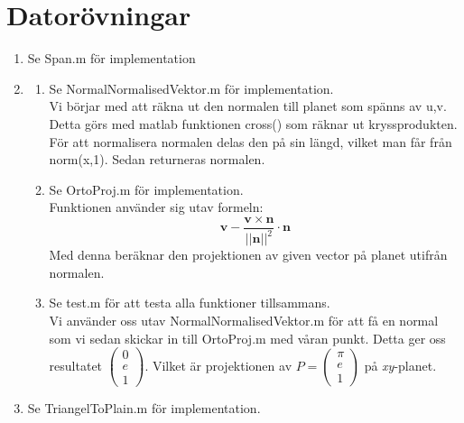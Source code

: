 \documentclass[a4paper]{report}
\begin{document}
\chapter{Datorövningar}
\begin{enumerate}
    \item Se Span.m för implementation
    \item \begin{enumerate}
        \item 
            Se NormalNormalisedVektor.m för implementation.\\
            Vi börjar med att räkna ut den normalen till planet som spänns av u,v.
            Detta görs med matlab funktionen cross() som räknar ut kryssprodukten.
            För att normalisera normalen delas den på sin längd, vilket man får från norm(x,1).
            Sedan returneras normalen.
        \item 
            Se OrtoProj.m för implementation.\\
            Funktionen använder sig utav formeln:
            \begin{displaymath}
                \bm{v}-\frac{\bm{v}\times \bm{n}}{||\bm{n}||^{2}}\cdot \bm{n}
            \end{displaymath}
            Med denna beräknar den projektionen av given vector på planet utifrån normalen.
        \item 
            Se test.m för att testa alla funktioner tillsammans.\\
            Vi använder oss utav NormalNormalisedVektor.m för att få en normal som vi sedan skickar in till OrtoProj.m med våran punkt.
            Detta ger oss resultatet $\begin{pmatrix}0\\e\\1\end{pmatrix}$. 
            Vilket är projektionen av $P = \begin{pmatrix}\pi\\e\\1\end{pmatrix}$ på \emph{xy}-planet.
    \end{enumerate}
    \item Se TriangelToPlain.m för implementation.
\end{enumerate}
\end{document}
